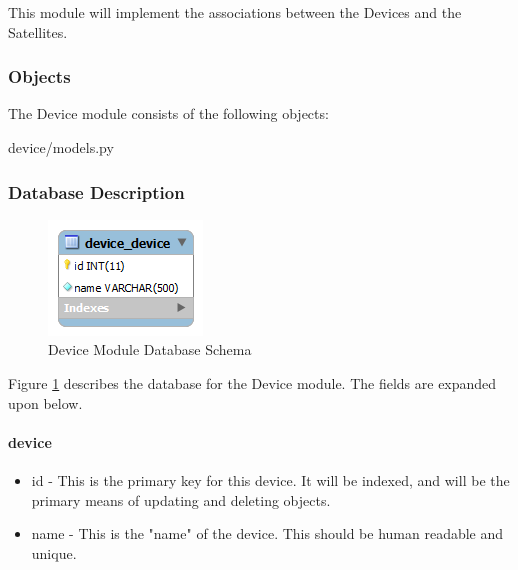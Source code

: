 This module will implement the associations between the Devices and the Satellites. 

\subsubsection{Objects}

The Device module consists of the following objects:

\begin{table}[H]
  \centering
  \caption{device/models.py}
  \label{code:device/models}
  
\end{table}

\subsubsection{Database Description}

\begin{figure}[H]
\centering
\includegraphics[scale=0.75]{Software/images/Database/Device.png}
\caption{Device Module Database Schema}
\label{img:S_Database_Device}
\end{figure}

Figure \ref{img:S_Database_Device} describes the database for the Device module. The fields are expanded upon below.

\paragraph{device}

\begin{itemize}
 \item id - This is the primary key for this device. It will be indexed, and will be the primary means of updating and deleting objects.
 \item name - This is the "name" of the device. This should be human readable and unique.
\end{itemize}